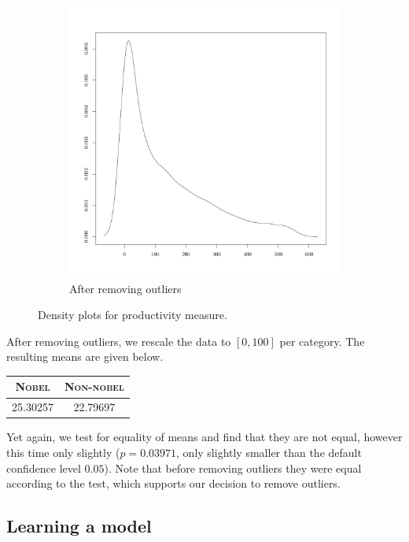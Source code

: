 \begin{figure}
\begin{subfigure}[b]{0.3\textwidth}
        \includegraphics[width=\textwidth]{figures/prodNoOutDensity}
        \caption{After removing outliers}
        \label{fig:prodNoOutDensity}
    \end{subfigure}
    \caption{Density plots for productivity measure.}
    \label{fig:productivity}
\end{figure}

After removing outliers, we rescale the data to $[0, 100]$ per category. The resulting means are given below.
\begin{table}[H]
\centering
\begin{tabular}{c|c}
\textbf{\textsc{Nobel}} & \textbf{\textsc{Non-nobel}} \\ \hline
\rule{0pt}{4mm}25.30257&22.79697 \\
\end{tabular}
\end{table}
\noindent Yet again, we test for equality of means and find that they are not equal, however this time only slightly ($p = 0.03971$, only slightly smaller than the default confidence level $0.05$). Note that before removing outliers they were equal according to the test, which supports our decision to remove outliers.

\subsection{Learning a model}




